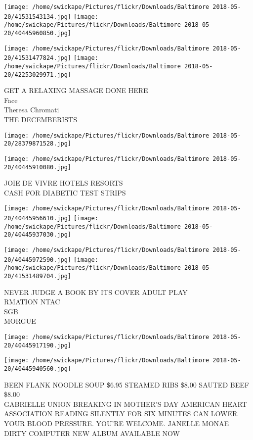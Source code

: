 \documentclass[10pt,letterpaper]{article}
\begin{document}
\texttt{[image: /home/swickape/Pictures/flickr/Downloads/Baltimore 2018-05-20/41531543134.jpg]}
\texttt{[image: /home/swickape/Pictures/flickr/Downloads/Baltimore 2018-05-20/40445960850.jpg]}

\texttt{[image: /home/swickape/Pictures/flickr/Downloads/Baltimore 2018-05-20/41531477824.jpg]}
\texttt{[image: /home/swickape/Pictures/flickr/Downloads/Baltimore 2018-05-20/42253029971.jpg]}

GET A RELAXING MASSAGE DONE HERE\\
Face\\
Theresa Chromati\\
THE DECEMBERISTS
\pagebreak

\texttt{[image: /home/swickape/Pictures/flickr/Downloads/Baltimore 2018-05-20/28379871528.jpg]}

\vspace{0.25in}
\texttt{[image: /home/swickape/Pictures/flickr/Downloads/Baltimore 2018-05-20/40445910080.jpg]}

JOIE DE VIVRE HOTELS RESORTS\\
CASH FOR DIABETIC TEST STRIPS
\pagebreak

\texttt{[image: /home/swickape/Pictures/flickr/Downloads/Baltimore 2018-05-20/40445956610.jpg]}
\texttt{[image: /home/swickape/Pictures/flickr/Downloads/Baltimore 2018-05-20/40445937030.jpg]}

\texttt{[image: /home/swickape/Pictures/flickr/Downloads/Baltimore 2018-05-20/40445972590.jpg]}
\texttt{[image: /home/swickape/Pictures/flickr/Downloads/Baltimore 2018-05-20/41531489704.jpg]}

NEVER JUDGE A BOOK BY ITS COVER ADULT PLAY\\
RMATION NTAC\\
SGB\\
MORGUE
\pagebreak

\texttt{[image: /home/swickape/Pictures/flickr/Downloads/Baltimore 2018-05-20/40445917190.jpg]}

\vspace{0.25in}
\texttt{[image: /home/swickape/Pictures/flickr/Downloads/Baltimore 2018-05-20/40445940560.jpg]}

BEEN FLANK NOODLE SOUP \$6.95 STEAMED RIBS \$8.00 SAUTED BEEF \$8.00\\
GABRIELLE UNION BREAKING IN MOTHER'S DAY AMERICAN HEART ASSOCIATION READING SILENTLY FOR SIX MINUTES CAN LOWER YOUR BLOOD PRESSURE.  YOU'RE WELCOME. JANELLE MONAE DIRTY COMPUTER NEW ALBUM AVAILABLE NOW
\pagebreak
\end{document}
